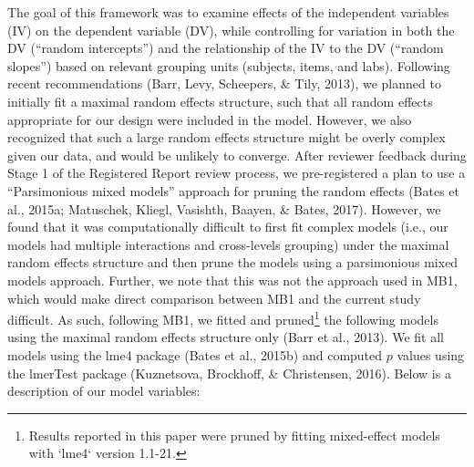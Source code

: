 \documentclass[,man,floatsintext]{apa6}
\begin{document}
The goal of this framework was to examine effects of the independent variables (IV) on the dependent variable (DV), while controlling for variation in both the DV (\enquote{random intercepts}) and the relationship of the IV to the DV (\enquote{random slopes}) based on relevant grouping units (subjects, items, and labs). Following recent recommendations (Barr, Levy, Scheepers, \& Tily, 2013), we planned to initially fit a maximal random effects structure, such that all random effects appropriate for our design were included in the model. However, we also recognized that such a large random effects structure might be overly complex given our data, and would be unlikely to converge. After reviewer feedback during Stage 1 of the Registered Report review process, we pre-registered a plan to use a \enquote{Parsimonious mixed models} approach for pruning the random effects (Bates et al., 2015a; Matuschek, Kliegl, Vasishth, Baayen, \& Bates, 2017). However, we found that it was computationally difficult to first fit complex models (i.e., our models had multiple interactions and cross-levels grouping) under the maximal random effects structure and then prune the models using a parsimonious mixed models approach. Further, we note that this was not the approach used in MB1, which would make direct comparison between MB1 and the current study difficult. As such, following MB1, we fitted and pruned\footnote{Results reported in this paper were pruned by fitting mixed-effect models with `lme4` version 1.1-21.} the following models using the maximal random effects structure only (Barr et al., 2013). We fit all models using the lme4 package (Bates et al., 2015b) and computed \(p\) values using the lmerTest package (Kuznetsova, Brockhoff, \& Christensen, 2016). Below is a description of our model variables:
\end{document}
